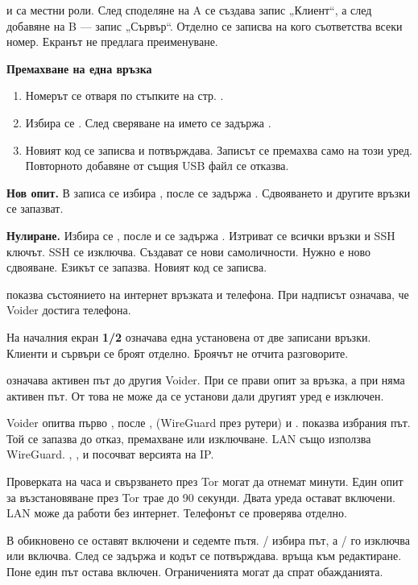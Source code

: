  и  са местни роли. След споделяне на A се създава запис „Клиент“, а след добавяне на B --- запис „Сървър“. Отделно се записва на кого съответства всеки номер. Екранът не предлага преименуване.

\textbf{Премахване на една връзка}
\begin{enumerate}
\item Номерът се отваря по стъпките на стр. \pageref{bg:find}.
\item Избира се  \arr {}. След сверяване на името се задържа .
\item Новият код се записва и потвърждава. Записът се премахва само на този уред. Повторното добавяне от същия USB файл се отказва.
\end{enumerate}

\textbf{Нов опит.} В записа се избира  \arr {}, после се задържа . Сдвояването и другите връзки се запазват.

\textbf{Нулиране.} Избира се  \arr {} \arr {} \arr {}, после  и се задържа . Изтриват се всички връзки и SSH ключът. SSH се изключва. Създават се нови самоличности. Нужно е ново сдвояване. Езикът се запазва. Новият код се записва.

 показва състоянието на интернет връзката и телефона. При  надписът  означава, че Voider достига телефона.

На началния екран \textbf{1/2} означава една установена от две записани връзки. Клиенти и сървъри се броят отделно. Броячът не отчита разговорите.

 означава активен път до другия Voider. При  се прави опит за връзка, а при  няма активен път. От това не може да се установи дали другият уред е изключен.

Voider опитва първо , после ,  (WireGuard през рутери) и .  показва избрания път. Той се запазва до отказ, премахване или изключване. LAN също използва WireGuard. , ,  и  посочват версията на IP.

Проверката на часа и свързването през Tor могат да отнемат минути. Един опит за възстановяване през Tor трае до 90 секунди. Двата уреда остават включени. LAN може да работи без интернет. Телефонът се проверява отделно.

В  обикновено се оставят включени и седемте пътя. / избира път, а / го изключва или включва. След  се задържа  и кодът се потвърждава.  връща към редактиране. Поне един път остава включен. Ограниченията могат да спрат обажданията.

